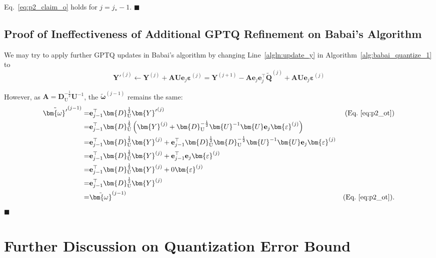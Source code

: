 \documentclass{article} %
\begin{document}
Eq.~\ref{eq:p2_claim_o} holds for $j = j_* - 1$.
\hfill $\blacksquare$

\subsection{Proof of Ineffectiveness of Additional GPTQ Refinement on Babai's Algorithm}
\label{sec:app_gptq_babai_no_combine}

We may try to apply further GPTQ updates in Babai's algorithm by changing Line~\ref{algln:update_y} in Algorithm~\ref{alg:babai_quantize_1} to
\begin{equation}
{\bm{Y}'}^{(j)} \leftarrow \bm{Y}^{(j)} + \bm{A} \bm{U} \mathbf{e}_{j} \bm{\varepsilon}^{(j)} = \bm{Y}^{(j+1)} - \bm{A} \mathbf{e}_{j} \mathbf{e}_{j}^\top \tilde{\bm{Q}}^{(j)} + \bm{A} \bm{U} \mathbf{e}_{j} \bm{\varepsilon}^{(j)}
\end{equation}

However, as $\bm{A} = \bm{D}_{\mathrm{U}}^{-\frac{1}{2}} \bm{U}^{-1}$, the $\tilde{\bm{\omega}}^{(j-1)}$ remains the same:
\begin{equation}
\begin{aligned}
\tilde{{\bm{\omega}}'}^{(j-1)}
= & \mathbf{e}_{j-1}^\top \bm{D}_{\mathrm{U}}^{\frac{1}{2}} {\bm{Y}'}^{(j)} & \text{(Eq.~\ref{eq:p2_ot})} \\
= & \mathbf{e}_{j-1}^\top \bm{D}_{\mathrm{U}}^{\frac{1}{2}} \left( \bm{Y}^{(j)} + \bm{D}_{\mathrm{U}}^{-\frac{1}{2}} \bm{U}^{-1} \bm{U} \mathbf{e}_{j} \bm{\varepsilon}^{(j)} \right) \\
= & \mathbf{e}_{j-1}^\top \bm{D}_{\mathrm{U}}^{\frac{1}{2}} \bm{Y}^{(j)} + \mathbf{e}_{j-1}^\top \bm{D}_{\mathrm{U}}^{\frac{1}{2}} \bm{D}_{\mathrm{U}}^{-\frac{1}{2}} \bm{U}^{-1} \bm{U} \mathbf{e}_{j} \bm{\varepsilon}^{(j)} \\
= & \mathbf{e}_{j-1}^\top \bm{D}_{\mathrm{U}}^{\frac{1}{2}} \bm{Y}^{(j)} + \mathbf{e}_{j-1}^\top \mathbf{e}_{j} \bm{\varepsilon}^{(j)} \\
= & \mathbf{e}_{j-1}^\top \bm{D}_{\mathrm{U}}^{\frac{1}{2}} \bm{Y}^{(j)} + 0 \bm{\varepsilon}^{(j)} \\
= & \mathbf{e}_{j-1}^\top \bm{D}_{\mathrm{U}}^{\frac{1}{2}} \bm{Y}^{(j)} \\
= & \tilde{\bm{\omega}}^{(j-1)} & \text{(Eq.~\ref{eq:p2_ot})} .
\end{aligned}
\end{equation}
\hfill $\blacksquare$

\clearpage

\section{Further Discussion on Quantization Error Bound}
\label{sec:app_error_bound}
\end{document}
